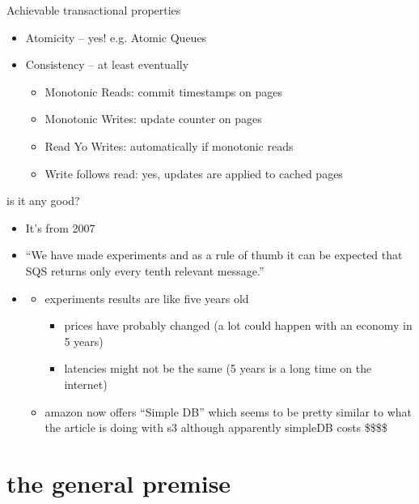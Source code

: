 \documentclass{beamer}
\begin{document}
  \begin{frame}{Achievable transactional properties}
    \begin{itemize}
    \item
      Atomicity -- yes! e.g. Atomic Queues
    \item
      Consistency -- at least eventually
      \begin{itemize}
      \item
        Monotonic Reads: commit timestamps on pages
      \item
        Monotonic Writes: update counter on pages
      \item
        Read Yo Writes: automatically if monotonic reads
      \item
        Write follows read: yes, updates are applied to cached pages
      \end{itemize}
    \end{itemize}
  \end{frame}

  \begin{frame}{is it any good?}
    \begin{itemize}
      \item
        It's from 2007
      \item
        ``We have made experiments and as a rule of thumb it can be expected that SQS returns only every tenth relevant message.''
      \item

        \begin{itemize}
        \item
          experiments results are like five years old
          \begin{itemize}
          \item
            prices have probably changed (a lot could happen with an economy in 5 years)
          \item 
            latencies might not be the same (5 years is a long time on the internet)
          \end{itemize}
        \item
          amazon now offers ``Simple DB'' which seems to be pretty similar to what the article is doing with s3 although apparently simpleDB costs \$\$\$\$
        \end{itemize}
      \end{itemize}
    \end{frame}

\section{the general premise}
\end{document}
